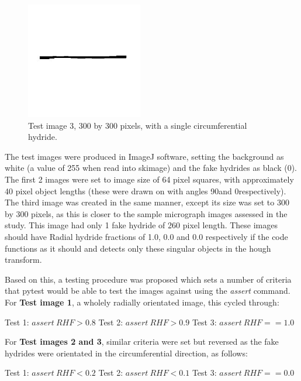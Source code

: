 \documentclass{article}
\begin{document}
\begin{figure}[h]
    \begin{center}
    \includegraphics[width=2.0in]{Figures/Test_3.jpg} 
    \caption{Test image 3, 300 by 300 pixels, with a single circumferential hydride.}
    \label{TestImage300}
    \end{center}
\end{figure}

The test images were produced in ImageJ software, setting the background as white (a value of 255 when read into skimage) and the fake hydrides as black (0). The first 2 images were set to image size of 64 pixel squares, with approximately 40 pixel object lengths (these were drawn on with angles 90\degree and 0\degree respectively). The third image was created in the same manner, except its size was set to 300 by 300 pixels, as this is closer to the sample micrograph images assessed in the study. This image had only 1 fake hydride of 260 pixel length. These images should have Radial hydride fractions of 1.0, 0.0 and 0.0 respectively if the code functions as it should and detects only these singular objects in the hough transform.

Based on this, a testing procedure was proposed which sets a number of criteria that pytest would be able to test the images against using the \textit{assert} command. For \textbf{Test image 1}, a wholely radially orientated image, this cycled through:

\begin{center}
    Test 1: $assert\:RHF > 0.8$ \newline
    Test 2: $assert\:RHF > 0.9$ \newline
    Test 3: $assert\:RHF == 1.0$ \newline
\end{center}

For \textbf{Test images 2 and 3}, similar criteria were set but reversed as the fake hydrides were orientated in the circumferential direction, as follows:
\begin{center}
    Test 1: $assert\:RHF < 0.2$ \newline
    Test 2: $assert\:RHF < 0.1$ \newline
    Test 3: $assert\:RHF == 0.0$ \newline 
\end{center}
\end{document}
